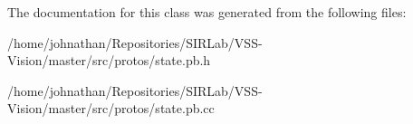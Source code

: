 The documentation for this class was generated from the following files\+:\begin{DoxyCompactItemize}
\item 
/home/johnathan/\+Repositories/\+S\+I\+R\+Lab/\+V\+S\+S-\/\+Vision/master/src/protos/state.\+pb.\+h\item 
/home/johnathan/\+Repositories/\+S\+I\+R\+Lab/\+V\+S\+S-\/\+Vision/master/src/protos/state.\+pb.\+cc\end{DoxyCompactItemize}
